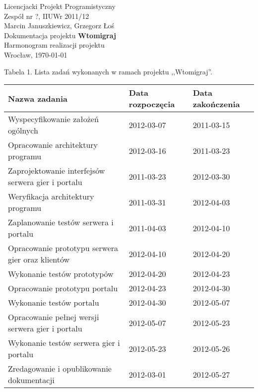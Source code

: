 \documentclass[11pt,leqno]{article}
\begin{document}
\begin{center}
\thispagestyle{empty}
{\Large Licencjacki Projekt Programistyczny}\\[0.5cm]
{\Large Zespół nr ?, IIUWr 2011/12}\\[2.5cm]

{\large Marcin Januszkiewicz, Grzegorz Łoś}\\[0.5cm]
{\huge Dokumentacja projektu \textbf{Wtomigraj}}\\[0.5cm]
{\huge Harmonogram realizacji projektu}\\[0.5cm]
\vfill
{\large Wrocław, \today}

\end{center}

\newpage
\newpage

\begin{landscape}
{\small Tabela 1. Lista zadań wykonanych w ramach projektu ,,Wtomigraj''.}
\\[0.3cm]
\begin{tabular}{|p{10cm}|l|l|}
\hline
\bf{Nazwa zadania} & \bf{Data rozpoczęcia} & \bf{Data zakończenia} \\ \hline
Wyspecyfikowanie założeń ogólnych                         & 2012-03-07 & 2011-03-15 \\ \hline
Opracowanie architektury programu                         & 2012-03-16 & 2011-03-23 \\ \hline
Zaprojektowanie interfejsów serwera gier i portalu        & 2011-03-23 & 2012-03-30 \\ \hline
Weryfikacja architektury programu                         & 2011-03-31 & 2012-04-03 \\ \hline
Zaplanowanie testów serwera i portalu                     & 2011-04-03 & 2012-04-10 \\ \hline
Opracowanie prototypu serwera gier oraz klientów          & 2012-04-10 & 2012-04-20 \\ \hline
Wykonanie testów prototypów                               & 2012-04-20 & 2012-04-23 \\ \hline
Opracowanie prototypu portalu                             & 2012-04-23 & 2012-04-30 \\ \hline
Wykonanie testów portalu                                  & 2012-04-30 & 2012-05-07 \\ \hline
Opracowanie pełnej wersji serwera gier i portalu          & 2012-05-07 & 2012-05-23 \\ \hline
Wykonanie testów serwera gier i portalu                   & 2012-05-23 & 2012-05-26 \\ \hline
Zredagowanie i opublikowanie dokumentacji                 & 2012-03-01 & 2012-05-27 \\ \hline
\end{tabular}


\end{landscape}
\end{document}

